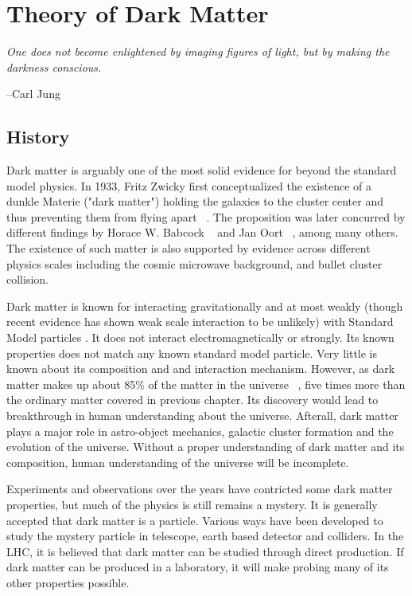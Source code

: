 \chapter{Theory of Dark Matter}


\epigraph{\textit{One does not become enlightened by imaging figures of light, but by making the darkness conscious.}}{--Carl Jung}


\section{History}
    Dark matter is arguably one of the most solid evidence for beyond the standard model physics. In 1933, Fritz Zwicky first conceptualized the existence of a dunkle Materie ("dark matter") holding the galaxies to the cluster center and thus preventing them from flying apart ~\cite{Zwicky}. The proposition was later concurred by different findings by Horace W. Babcock ~\cite{Babcock} and Jan Oort ~\cite{oort}, among many others. The existence of such matter is also supported by evidence across different physics scales including the cosmic microwave background, and bullet cluster collision.

    Dark matter is known for interacting gravitationally and at most weakly (though recent evidence has shown weak scale interaction to be unlikely) with Standard Model particles . It does not interact electromagnetically or strongly. Its known properties does not match any known standard model particle. Very little is known about its composition and and interaction mechanism. However, as dark matter makes up about 85\% of the matter in the universe ~\cite{Hinshaw_2013}, five times more than the ordinary matter covered in previous chapter. Its discovery would lead to breakthrough in human understanding about the universe. Afterall, dark matter plays a major role in astro-object mechanics, galactic cluster formation and the evolution of the universe. Without a proper understanding of dark matter and its composition, human understanding of the universe will be incomplete.

    Experiments and observations over the years have contricted some dark matter properties, but much of the physics is still remains a mystery. It is generally accepted that dark matter is a particle. Various ways have been developed to study the mystery particle in telescope, earth based detector and colliders. In the LHC, it is believed that dark matter can be studied through direct production. If dark matter can be produced in a laboratory, it will make probing many of its other properties possible. 

